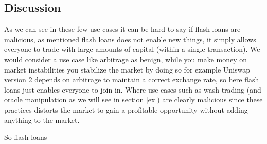 \subsection{Discussion}
As we can see in these few use cases it can be hard to say if flash
loans are malicious, as mentioned flash loans does not enable new
things, it simply allows everyone to trade with large amounts of
capital (within a single transaction). We would consider a use case
like arbitrage as benign, while you make money on market instabilities
you stabilize the market by doing so for example Uniswap version 2
depends on arbitrage to maintain a correct exchange rate, so here
flash loans just enables everyone to join in. Where use cases such as
wash trading (and oracle manipulation as we will see in section
\ref{ex}) are clearly malicious since these practices distorts the
market to gain a profitable opportunity without adding anything to the
market.

So flash loans
